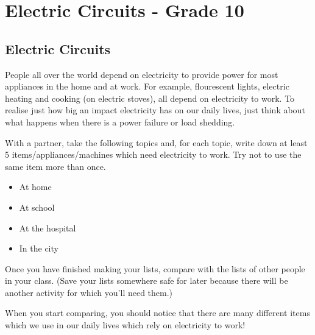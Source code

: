 



\chapter{Electric Circuits - Grade 10}
\label{p:ElecCircuitsG10}


\section{Electric Circuits}

People all over the world depend on electricity to provide power for most appliances in the home and at work. For example, flourescent lights, electric heating and cooking (on electric stoves), all depend on electricity to work.
To realise just how big an impact electricity has on our daily lives, just think about what happens when there is a power
failure or load shedding.

{
\noindent With a partner, take the following topics and, for each topic, write down at least 5 items/appliances/machines which need
electricity to work. Try not to use the same item more than once.
\begin{itemize}
\item At home
\item At school
\item At the hospital
\item In the city
\end{itemize} 
Once you have finished making your lists, compare with the lists of other people in your class. (Save your lists somewhere safe for later because there will be another activity for which you'll need them.)

\noindent When you start comparing, you should notice that there are many different items which we use in our daily lives which rely on electricity to work! 
}



